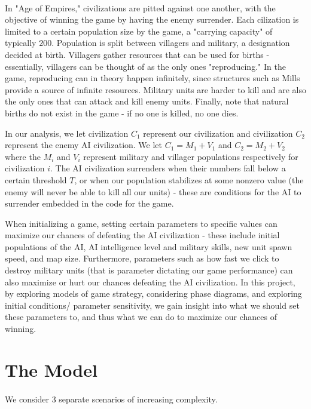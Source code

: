 \documentclass[12pt]{article}
\begin{document}
\paragraph{}
In "Age of Empires," civilizations are pitted against one another, with the objective of winning the game by having the enemy surrender. Each cilization is limited to a certain population size by the game, a "carrying capacity" of typically $200$. Population is split between villagers and military, a designation decided at birth. Villagers gather resources that can be used for births - essentially, villagers can be thought of as the only ones "reproducing." In the game, reproducing can in theory happen infinitely, since structures such as Mills provide a source of infinite resources. Military units are harder to kill and are also the only ones that can attack and kill enemy units. Finally, note that natural births do not exist in the game - if no one is killed, no one dies. \par
In our analysis, we let civilization $C_1$ represent our civilization and civilization $C_2$ represent the enemy AI civilization. We let $C_1 = M_1 + V_1$ and $C_2 = M_2 + V_2$ where the $M_i$ and $V_i$ represent military and villager populations respectively for civilization $i$. The AI civilization surrenders when their numbers fall below a certain threshold $T$, or when our population stabilizes at some nonzero value (the enemy will never be able to kill all our units) - these are conditions for the AI to surrender embedded in the code for the game. \par
When initializing a game, setting certain parameters to specific values can maximize our chances of defeating the AI civilization - these include initial populations of the AI, AI intelligence level and military skills, new unit spawn speed, and map size. Furthermore, parameters such as how fast we click to destroy military units (that is parameter dictating our game performance) can also maximize or hurt our chances defeating the AI civilization. In this project, by exploring models of game strategy, considering phase diagrams, and exploring initial conditions/ parameter sensitivity, we gain insight into what we should set these parameters to, and thus what we can do to maximize our chances of winning. \par

\section{The Model}
\paragraph{}
We consider 3 separate scenarios of increasing complexity. 
\end{document}
